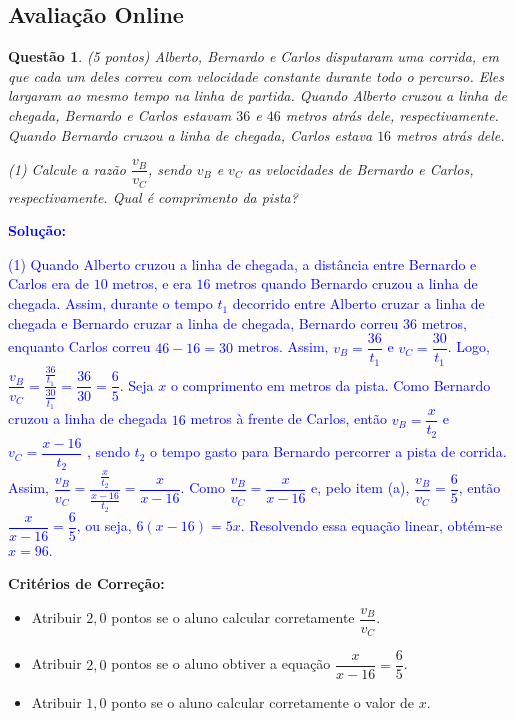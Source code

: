 \documentclass[oneside,a4paper,12pt]{article}
\newcommand{\negrito}[1]{\mbox{\boldmath{$#1$}}}
\theoremstyle{Colorido}
\theoremstyle{solu}
\theoremstyle{dotlessP}
\newcommand{\solucao}[1]{\textcolor{blue}{\textbf{Solução:} #1}}
\newtheorem{sol}{Questão}
\begin{document}
\newpage
	\textcolor{Floresta}{\section{Avaliação Online}}
	\begin{sol}
\textit{(5 pontos)} \newline \newline	
	Alberto, Bernardo e Carlos disputaram uma corrida, em que cada um deles correu com velocidade constante durante todo o percurso. Eles largaram ao mesmo tempo na linha de partida. Quando Alberto cruzou a linha de chegada, Bernardo e Carlos estavam $36$ e $46$ metros atrás dele, respectivamente. Quando Bernardo cruzou a linha de chegada, Carlos estava $16$ metros atrás dele.
	\begin{tasks}[counter-format={(tsk[a])},label-width=3.6ex, label-format = {\bfseries}, column-sep = {20pt}](1)
\task[\textcolor{blue}{$\negrito{(a)} $}] Calcule a razão $\dfrac{v_B}{v_C}$, sendo $v_B$ e $v_C$ as velocidades de Bernardo e Carlos, respectivamente.
\task[\textcolor{blue}{$\negrito{(b)} $}] Qual é comprimento da pista?
\end{tasks}
\end{sol}
\solucao{	\begin{tasks}[counter-format={(tsk[a])},label-width=3.6ex, label-format = {\bfseries}, column-sep = {20pt}](1)
\task[\textcolor{blue}{$\negrito{(a)} $}] Quando Alberto cruzou a linha de chegada, a distância entre Bernardo e Carlos era de $10$ metros, e era $16$ metros quando Bernardo cruzou a linha de chegada. Assim, durante o tempo $t_1$ decorrido entre Alberto cruzar a linha de chegada e Bernardo cruzar a linha de chegada, Bernardo correu $36$ metros, enquanto Carlos correu $46-16=30$ metros. Assim, $v_B=\dfrac{36}{t_1}$  e $v_C=\dfrac{30}{t_1}$. Logo, $\dfrac{v_B}{v_C} =\dfrac{\frac{36}{t_1}}{\frac{30}{t_1}}=\dfrac{36}{30}=\dfrac{6}{5}$.
\task[\textcolor{blue}{$\negrito{(b)} $}] Seja $x$ o comprimento em metros da pista. Como Bernardo cruzou a linha de chegada $16$ metros à frente de Carlos, então $v_B=\dfrac{x}{t_2}$  e $v_C=\dfrac{x-16}{t_2}$ , sendo $t_2$ o tempo gasto para Bernardo percorrer a pista de corrida. Assim, $\dfrac{v_B}{v_C}=\dfrac{\frac{x}{t_2}}{\frac{x-16}{t_2}}=\dfrac{x}{x-16}$. Como $\dfrac{v_B}{v_C}=\dfrac{x}{x-16}$ e, pelo item (a), $\dfrac{v_B}{v_C}=\dfrac{6}{5}$, então $\dfrac{x}{x-16}=\dfrac{6}{5}$, ou seja, $6(x-16)=5x$. Resolvendo essa equação linear, obtém-se $x=96$.
\end{tasks}}
\begin{mdframed}
\textbf{Critérios de Correção:} \\
\begin{itemize}
    \item Atribuir $2,0$ pontos se o aluno calcular corretamente $\dfrac{v_B}{v_C}$. 
    \item Atribuir $2,0$ pontos se o aluno obtiver a equação $\dfrac{x}{x-16}=\dfrac{6}{5}$.
    \item Atribuir $1,0$ ponto se o aluno calcular corretamente o valor de $x$.
\end{itemize}
\end{mdframed}
\end{document}
